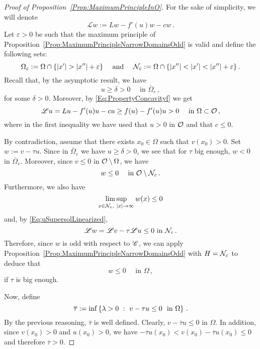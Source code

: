 \begin{proof}[Proof of Proposition~\ref{Prop:MaximumPrincipleInO}]
    


	For the sake of simplicity, we will denote 
	$$
	\mathscr{L} w := Lw - f'(u)w - cw\,.
	$$
	Let $\varepsilon > 0$ be such that the maximum principle of Proposition~\ref{Prop:MaximumPrincipleNarrowDomainsOdd} is valid and define the following sets:
	$$
	\Omega_\varepsilon := \Omega \cap \{|x'| > |x''| + \varepsilon\}\quad \textrm{ and } \quad 
	\mathcal{N}_\varepsilon := \Omega \cap \{|x''| < |x'| < |x''| + \varepsilon\}\,.
	$$
	Recall that, by the asymptotic result, we have 
	$$
	u \geq \delta > 0 \quad \textrm{ in } \overline{\Omega}_\varepsilon\,,
	$$
	for some $\delta >0$.  Moreover, by \eqref{Eq:PropertyConcavityf} we get
	\begin{equation}
	\label{Eq:uSupersolLinearized}
	\mathscr{L} u = Lu - f'(u)u - cu \geq f(u) - f'(u)u > 0 \quad \textrm{ in } \Omega \subset \mathcal{O}\,,
	\end{equation}
	where in the first inequality we have used that $u>0$ in $\mathcal{O}$ and that $c\leq 0$.
	
    
    By contradiction, assume that there exists $x_0\in \Omega$ such that $v(x_0)> 0$.
	Set $w := v - \tau u$. Since in $\overline{\Omega}_\varepsilon$ we have $u \geq \delta > 0$, we see that for $\tau$ big enough, $w < 0$ in $\overline{\Omega}_\varepsilon$. Moreover, since $v\leq 0$ in $\mathcal{O}\setminus\Omega$, we have 
	$$
	w \leq 0 \quad \textrm{ in } \mathcal{O} \setminus \mathcal{N}_\varepsilon\,.
	$$
	Furthermore, we also have
	$$
	\limsup_{x\in \mathcal{N}_\varepsilon, \ |x|\to \infty} w(x) \leq 0
	$$
	and, by \eqref{Eq:uSupersolLinearized},
	$$
	\mathscr{L} w = \mathscr{L} v - \tau \mathscr{L} u \leq 0 \textrm{ in } \mathcal{N}_\varepsilon\,.
	$$
	Therefore, since $w$ is odd with respect to $\mathscr{C}$, we can apply Proposition~\ref{Prop:MaximumPrincipleNarrowDomainsOdd} with $H = \mathcal{N}_\varepsilon$ to deduce that
	$$
	w \leq 0 \quad \textrm{ in } \Omega\,,
	$$
	if $\tau$ is big enough.
	
	Now, define 
	$$
	\overline{\tau}:= \inf \left \{ \lambda > 0 \ : \ v - \tau u \leq 0 \ \textrm{ in } \Omega \right \}\,.
	$$
	By the previous reasoning, $\overline{\tau}$ is well defined. Clearly, $v - \overline{\tau} u \leq 0 $ in $\Omega$. In addition, since $v(x_0)>0$ and $u(x_0)>0$, we have $-\overline{\tau} u(x_0) < v(x_0) - \overline{\tau} u (x_0) \leq 0$ and therefore $\overline{\tau} > 0$.
	

\end{proof}
